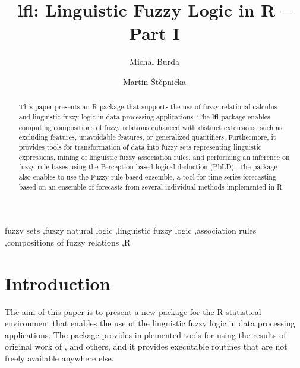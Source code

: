 \documentclass[review]{elsarticle}
\newcommand{\pkg}[1]{\textbf{#1}}
\newcommand{\proglang}[1]{#1}
\newcommand{\R}{\proglang{R}}
\begin{document}
\begin{frontmatter}

\title{lfl: Linguistic Fuzzy Logic in \R{} -- Part I}

\author{Michal Burda}
\author{Martin \v{S}t\v{e}pni\v{c}ka}
\address{Institute for Research and Applications of Fuzzy Modeling, University of Ostrava, CE~IT4Innovations, 30.~dubna 22, 701 03 Ostrava, Czech Republic}


\begin{abstract}
This paper presents an \R{} package that supports the use of fuzzy relational calculus and linguistic fuzzy logic in data processing applications. The \pkg{lfl} package enables computing compositions of fuzzy relations enhanced with distinct extensions, such as excluding features, unavoidable features, or generalized quantifiers. Furthermore, it provides tools for transformation of data into fuzzy sets representing linguistic expressions, mining of linguistic fuzzy association rules, and performing an inference on fuzzy rule bases using the Perception-based logical deduction (PbLD). The package also enables to use the Fuzzy rule-based ensemble, a tool for time series forecasting based on an ensemble of forecasts from several individual methods implemented in \R{}.
\end{abstract}

\begin{keyword}
fuzzy sets \sep fuzzy natural logic \sep linguistic fuzzy logic \sep association rules \sep compositions of fuzzy relations \sep\R{}
\end{keyword}

\end{frontmatter}

\linenumbers


\section{Introduction} \label{sec:intro}


The aim of this paper is to present a new package for the \R{} statistical environment
\citep{R2020} that enables the use of the linguistic fuzzy logic in data processing
applications. The package provides implemented tools for using the results of original work of
\cite{Novak08, Novak:PbLD, DvoStep:PbLD2015, StepBurda:FRBE_FSS}, and others, and it provides
executable routines that are not freely available anywhere else.
\end{document}
